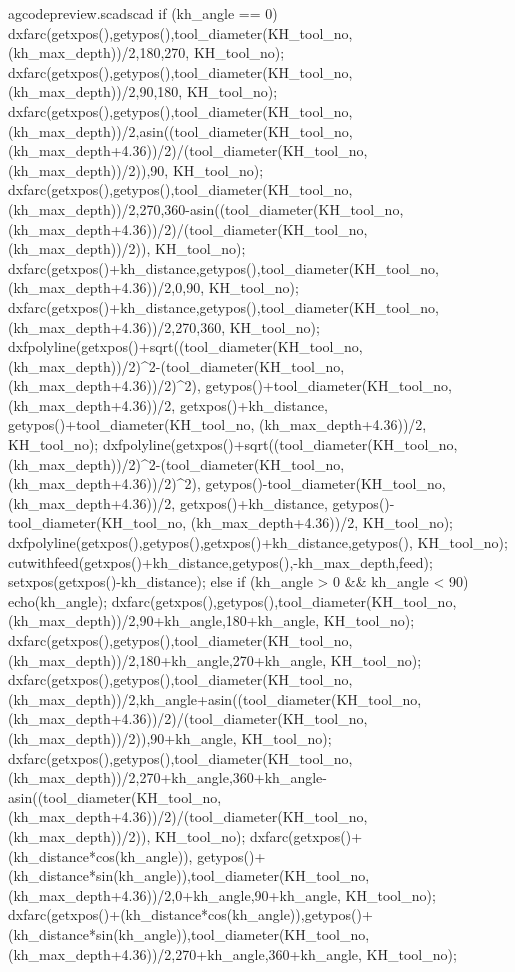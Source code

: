\documentclass{ltxdoc}
\begin{document}
\lstset{firstnumber=\thegcpscad}
\begin{writecode}{a}{gcodepreview.scad}{scad}
  if (kh_angle == 0) {
dxfarc(getxpos(),getypos(),tool_diameter(KH_tool_no, (kh_max_depth))/2,180,270, KH_tool_no);
dxfarc(getxpos(),getypos(),tool_diameter(KH_tool_no, (kh_max_depth))/2,90,180, KH_tool_no);
dxfarc(getxpos(),getypos(),tool_diameter(KH_tool_no, (kh_max_depth))/2,asin((tool_diameter(KH_tool_no, (kh_max_depth+4.36))/2)/(tool_diameter(KH_tool_no, (kh_max_depth))/2)),90, KH_tool_no);
dxfarc(getxpos(),getypos(),tool_diameter(KH_tool_no, (kh_max_depth))/2,270,360-asin((tool_diameter(KH_tool_no, (kh_max_depth+4.36))/2)/(tool_diameter(KH_tool_no, (kh_max_depth))/2)), KH_tool_no);
dxfarc(getxpos()+kh_distance,getypos(),tool_diameter(KH_tool_no, (kh_max_depth+4.36))/2,0,90, KH_tool_no);
dxfarc(getxpos()+kh_distance,getypos(),tool_diameter(KH_tool_no, (kh_max_depth+4.36))/2,270,360, KH_tool_no);
dxfpolyline(getxpos()+sqrt((tool_diameter(KH_tool_no, (kh_max_depth))/2)^2-(tool_diameter(KH_tool_no, (kh_max_depth+4.36))/2)^2), getypos()+tool_diameter(KH_tool_no, (kh_max_depth+4.36))/2, getxpos()+kh_distance, getypos()+tool_diameter(KH_tool_no, (kh_max_depth+4.36))/2, KH_tool_no);
dxfpolyline(getxpos()+sqrt((tool_diameter(KH_tool_no, (kh_max_depth))/2)^2-(tool_diameter(KH_tool_no, (kh_max_depth+4.36))/2)^2), getypos()-tool_diameter(KH_tool_no, (kh_max_depth+4.36))/2, getxpos()+kh_distance, getypos()-tool_diameter(KH_tool_no, (kh_max_depth+4.36))/2, KH_tool_no);
dxfpolyline(getxpos(),getypos(),getxpos()+kh_distance,getypos(), KH_tool_no);
cutwithfeed(getxpos()+kh_distance,getypos(),-kh_max_depth,feed);
setxpos(getxpos()-kh_distance);
  } else if (kh_angle > 0 && kh_angle < 90) {
echo(kh_angle);
  dxfarc(getxpos(),getypos(),tool_diameter(KH_tool_no, (kh_max_depth))/2,90+kh_angle,180+kh_angle, KH_tool_no);
  dxfarc(getxpos(),getypos(),tool_diameter(KH_tool_no, (kh_max_depth))/2,180+kh_angle,270+kh_angle, KH_tool_no);
dxfarc(getxpos(),getypos(),tool_diameter(KH_tool_no, (kh_max_depth))/2,kh_angle+asin((tool_diameter(KH_tool_no, (kh_max_depth+4.36))/2)/(tool_diameter(KH_tool_no, (kh_max_depth))/2)),90+kh_angle, KH_tool_no);
dxfarc(getxpos(),getypos(),tool_diameter(KH_tool_no, (kh_max_depth))/2,270+kh_angle,360+kh_angle-asin((tool_diameter(KH_tool_no, (kh_max_depth+4.36))/2)/(tool_diameter(KH_tool_no, (kh_max_depth))/2)), KH_tool_no);
dxfarc(getxpos()+(kh_distance*cos(kh_angle)),
  getypos()+(kh_distance*sin(kh_angle)),tool_diameter(KH_tool_no, (kh_max_depth+4.36))/2,0+kh_angle,90+kh_angle, KH_tool_no);
dxfarc(getxpos()+(kh_distance*cos(kh_angle)),getypos()+(kh_distance*sin(kh_angle)),tool_diameter(KH_tool_no, (kh_max_depth+4.36))/2,270+kh_angle,360+kh_angle, KH_tool_no);
}
\end{writecode}
\end{document}
